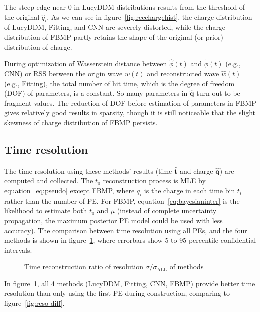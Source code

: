 The steep edge near 0 in LucyDDM distributions results from the threshold of the original $\hat{q}_i$. As we can see in figure~\ref{fig:recchargehist}, the charge distribution of LucyDDM, Fitting, and CNN are severely distorted, while the charge distribution of FBMP partly retains the shape of the original (or prior) distribution of charge. 

During optimization of Wasserstein distance between $\hat{\phi}(t)$ and $\tilde{\phi}(t)$ (e.g., CNN) or RSS between the origin wave $w(t)$ and reconstructed wave $\hat{w}(t)$ (e.g., Fitting), the total number of hit time, which is the degree of freedom (DOF) of parameters, is a constant. So many parameters in $\bm{\hat{q}}$ turn out to be fragment values. The reduction of DOF before estimation of parameters in FBMP gives relatively good results in sparsity, though it is still noticeable that the slight skewness of charge distribution of FBMP persists. 

\subsection{Time resolution}
\label{subsec:timeresolution}


The time resolution using these methods' results (time $\bm{\hat{t}}$ and charge $\bm{\hat{q}}$) are computed and collected. The $t_{0}$ reconstruction process is MLE by equation~\eqref{eq:pseudo} except FBMP, where $q_{i}$ is the charge in each time bin $t_{i}$ rather than the number of PE. For FBMP, equation~\eqref{eq:bayesianinter} is the likelihood to estimate both $t_{0}$ and $\mu$ (instead of complete uncertainty propagation, the maximum posterior PE model could be used with less accuracy). The comparison between time resolution using all PEs, and the four methods is shown in figure~\ref{fig:deltamethods}, where errorbars show 5 to 95 percentile confidential intervals. 

\begin{figure}[H]
    \centering
    \resizebox{\textwidth}{!}{}
    \caption{\label{fig:deltamethods} Time reconstruction ratio of resolution $\sigma/\sigma_{\mathrm{ALL}}$ of methods}
\end{figure}

In figure~\ref{fig:deltamethods}, all 4 methods (LucyDDM, Fitting, CNN, FBMP) provide better time resolution than only using the first PE during construction, comparing to figure~\ref{fig:reso-diff}. 

